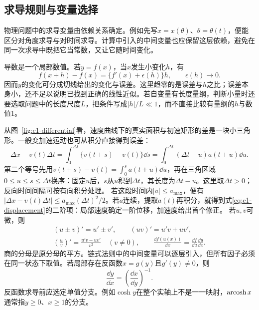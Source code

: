 \subsection{求导规则与变量选择}

物理问题中的求导变量由依赖关系确定。例如先写$x=x(\theta)$、$\theta=\theta(t)$，便能区分对角度求导与对时间求导。计算中引入的中间变量也应保留这层依赖，避免在同一次求导中既把它当常数，又让它随时间变化。

导数是一个局部数值。若$y=f(x)$，当$x$发生小变化$h$，有
\[f(x+h)-f(x)=\{f'(x)+\epsilon(h)\}h,\qquad \epsilon(h)\to0.\]
因而$y$的变化可分成切线给出的变化与误差。这里趋零的是误差与$h$之比；误差本身小，还不足以说明已找到正确的线性近似。若自变量有长度量纲，判断小量时还要选取问题中的长度尺度$L$，把条件写成$|h|/L\ll1$，而不直接比较有量纲的$h$与数值$1$。

从图~\ref{fig:c1-differential}看，速度曲线下的真实面积与初速矩形的差是一块小三角形。一般变加速运动也可从积分直接得到误差：
\[\Delta x-v(t)\Delta t
=\int_0^{\Delta t}\{v(t+s)-v(t)\}\dd s
=\int_0^{\Delta t}(\Delta t-u)a(t+u)\dd u.\]
第二个等号先用$v(t+s)-v(t)=\int_0^sa(t+u)\dd u$，再在三角区域$0\le u\le s\le\Delta t$换序：固定$u$后，$s$从$u$积到$\Delta t$，其长度为$\Delta t-u$。这里取$\Delta t>0$；反向时间间隔可按有向积分处理。
若这段时间内$|a|\le a_{\max}$，便有$|\Delta x-v(t)\Delta t|\le a_{\max}(\Delta t)^2/2$。若$a$连续，提取$a(t)$再积分，就得到式\eqref{eq:c1-displacement}的二阶项：局部速度确定一阶位移，加速度给出首个修正。
若$u,v$可微，则
\begin{gather}
 (u\pm v)'=u'\pm v',\qquad (uv)'=u'v+uv',\\
 \left(\frac uv\right)'=\frac{u'v-uv'}{v^2}\quad(v\ne0),\qquad
 \frac{\dd f(u(x))}{\dd x}=\frac{\dd f}{\dd u}\frac{\dd u}{\dd x}.
\end{gather}
商的分母是原分母的平方。链式法则中的中间变量可以逐层引入，但所有因子必须在同一状态下取值。若局部存在反函数$x=g(y)$且$g'(y)\ne0$，则
\begin{equation}\frac{\dd y}{\dd x}=\left(\frac{\dd x}{\dd y}\right)^{-1}.
\end{equation}
反函数求导前应选定单值分支。例如$\cosh y$在整个实轴上不是一一映射，$\operatorname{arcosh} x$通常指$y\ge0$、$x\ge1$的分支。

